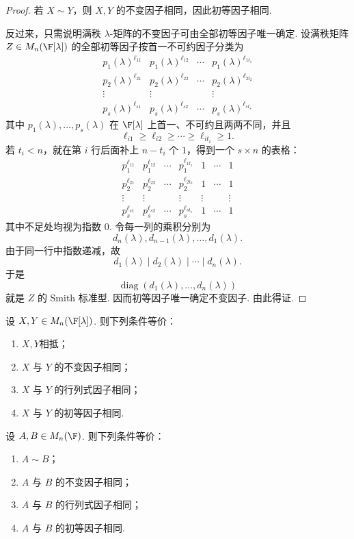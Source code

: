 \begin{proof}
	若 $X\sim Y$，则 $X,Y$ 的不变因子相同，因此初等因子相同.
	
	反过来，只需说明满秩 $\lambda$-矩阵的不变因子可由全部初等因子唯一确定.
	设满秩矩阵 $Z\in M_n(\F[\lambda])$ 的全部初等因子按首一不可约因子分类为
	\[
	\begin{array}{cccc}
		p_1(\lambda)^{\ell_{11}}&p_1(\lambda)^{\ell_{12}}&\cdots&p_1(\lambda)^{\ell_{1t_1}}\\
		p_2(\lambda)^{\ell_{21}}&p_2(\lambda)^{\ell_{22}}&\cdots&p_2(\lambda)^{\ell_{2t_2}}\\
		\vdots&\vdots&&\vdots\\
		p_s(\lambda)^{\ell_{s1}}&p_s(\lambda)^{\ell_{s2}}&\cdots&p_s(\lambda)^{\ell_{st_s}}
	\end{array}
	\]
	其中 $p_1(\lambda),\ldots,p_s(\lambda)$ 在 $\F[\lambda]$ 上首一、不可约且两两不同，并且
	\[
	\ell_{i1}\geq \ell_{i2}\geq\cdots\geq \ell_{it_i}\geq1.
	\]
	若 $t_i<n$，就在第 $i$ 行后面补上 $n-t_i$ 个 $1$，得到一个 $s\times n$ 的表格：
	\[
	\begin{array}{ccccccc}
		p_1^{\ell_{11}}&p_1^{\ell_{12}}&\cdots&p_1^{\ell_{1t_1}}&1&\cdots&1\\
		p_2^{\ell_{21}}&p_2^{\ell_{22}}&\cdots&p_2^{\ell_{2t_2}}&1&\cdots&1\\
		\vdots&\vdots&&\vdots&\vdots&&\vdots\\
		p_s^{\ell_{s1}}&p_s^{\ell_{s2}}&\cdots&p_s^{\ell_{st_s}}&1&\cdots&1
	\end{array}
	\]
	其中不足处均视为指数 $0$.
	令每一列的乘积分别为
	\[
	d_n(\lambda),d_{n-1}(\lambda),\ldots,d_1(\lambda).
	\]
	由于同一行中指数递减，故
	\[
	d_1(\lambda)\mid d_2(\lambda)\mid\cdots\mid d_n(\lambda).
	\]
	于是
	\[
	\operatorname{diag}(d_1(\lambda),\ldots,d_n(\lambda))
	\]
	就是 $Z$ 的 Smith 标准型. 因而初等因子唯一确定不变因子. 由此得证.
\end{proof}
\begin{corollary}
	设 $X,Y\in M_n(\F[\lambda])$. 则下列条件等价：
	\begin{enumerate}
		\item $X, Y$相抵；
		\item $X$ 与 $Y$ 的不变因子相同；
		\item $X$ 与 $Y$ 的行列式因子相同；
		\item $X$ 与 $Y$ 的初等因子相同.
	\end{enumerate}
\end{corollary}
\begin{corollary}
		设 $A,B\in M_n(\F)$. 则下列条件等价：
	\begin{enumerate}
		\item $A\sim B$；
		\item $A$ 与 $B$ 的不变因子相同；
		\item $A$ 与 $B$ 的行列式因子相同；
		\item $A$ 与 $B$ 的初等因子相同.
	\end{enumerate}
\end{corollary}



